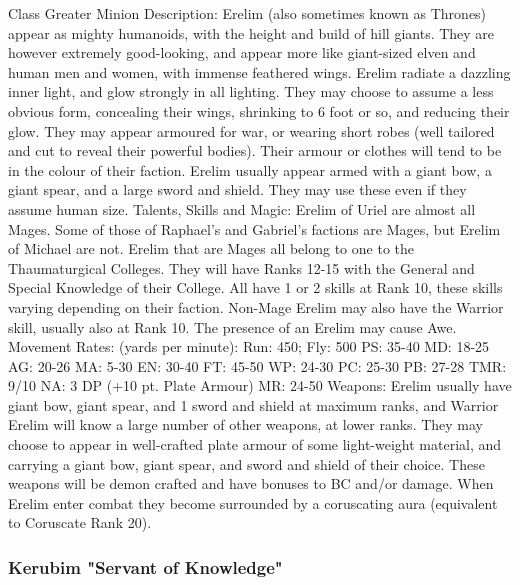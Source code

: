 \begin{Description}

\item[Class] Greater Minion
Description: Erelim (also sometimes known as Thrones) appear as mighty humanoids, with the height and build of hill giants. They are however extremely good-looking, and appear more like giant-sized elven and human men and women, with immense feathered wings. Erelim radiate a dazzling inner light, and glow strongly in all lighting. They may choose to assume a less obvious form, concealing their wings, shrinking to 6 foot or so, and reducing their glow. They may appear armoured for war, or wearing  short robes (well tailored and cut to reveal their powerful bodies). Their armour or clothes will tend to be in the colour of their faction. Erelim usually appear armed with a giant bow, a giant spear, and a large sword and shield. They may use these even if they assume human size.
Talents, Skills and Magic: Erelim of Uriel are almost all Mages. Some of those of Raphael's and Gabriel's factions are Mages, but Erelim of Michael are not. Erelim that are Mages all belong to one to the Thaumaturgical Colleges. They will have Ranks 12-15 with the General and Special Knowledge of their College. All have 1 or 2 skills at Rank 10, these skills varying depending on their faction. Non-Mage Erelim may also have the Warrior skill, usually also at Rank 10. The presence of an Erelim may cause Awe.
Movement Rates: (yards per minute): Run: 450; Fly: 500
PS: 35-40		MD: 18-25	AG: 20-26	MA: 5-30
EN: 30-40	FT: 45-50	WP: 24-30	PC: 25-30
PB: 27-28	TMR: 9/10	NA: 3 DP (+10 pt. Plate Armour)
MR: 24-50
Weapons: Erelim usually have giant bow, giant spear, and 1 sword and shield at maximum ranks, and Warrior Erelim will know a large number of other weapons, at lower ranks. They may choose to appear in well-crafted plate armour of some light-weight material, and carrying a giant bow, giant spear, and sword and shield of their choice. These weapons will be demon crafted and have bonuses to BC and/or damage. When Erelim enter combat they become surrounded by a coruscating aura (equivalent to Coruscate Rank 20).
\end{Description}

\subsubsection{Kerubim "Servant of Knowledge"}

